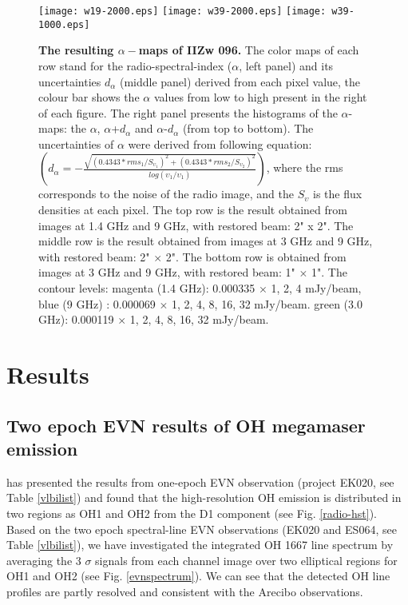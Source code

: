 \documentclass[]{aa} %
\begin{document}
\begin{figure*}
   \centering
\texttt{[image: w19-2000.eps]}
\texttt{[image: w39-2000.eps]}
\texttt{[image: w39-1000.eps]}


      \caption{\textbf{The resulting $\alpha-$maps of IIZw 096.} The color maps of each row stand for the radio-spectral-index ($\alpha$, left panel) and its uncertainties $d_{\alpha}$ (middle panel) derived from each pixel value, the colour bar shows the $\alpha$ values from low to high present in the right of each figure. The right panel presents the histograms of the $\alpha$-maps: the $\alpha$, $\alpha$+$d_{\alpha}$ and $\alpha$-$d_{\alpha}$ (from top to bottom). The uncertainties of $\alpha$ were derived from following equation: $(d_{\alpha}=-\frac{\sqrt{(0.4343*rms_{1}/S_{{\upsilon}_{1}})^2+(0.4343*rms_{2}/S_{{\upsilon}_{2}})^2}}{log(\upsilon_{1}/\upsilon_{1})})$, where the rms corresponds to the noise of the radio image, and the $S_{\upsilon}$ is the flux densities at each pixel. The top row is the result obtained from images at 1.4 GHz and 9 GHz, with restored beam: 2" x 2". The middle row is the result obtained from images at 3 GHz and 9 GHz, with restored beam: 2" $\times$ 2". The bottom row is obtained from images at 3 GHz and 9 GHz, with restored beam: 1" $\times$ 1". The contour levels: magenta (1.4 GHz): 0.000335 $\times$ 1, 2, 4 mJy/beam,  blue (9 GHz) : 0.000069 $\times$ 1, 2, 4, 8, 16, 32 mJy/beam.  green (3.0 GHz): 0.000119 $\times$ 1, 2, 4, 8, 16, 32 mJy/beam. }
    \label{359}%
\end{figure*}



\section{Results}
\subsection{Two epoch EVN results of OH megamaser emission}
  \cite{2010PhDT.......280C} has presented the results from one-epoch EVN observation (project EK020, see Table \ref{vlbilist}) and found that the high-resolution OH emission is distributed in two regions as OH1 and OH2 from the D1 component (see Fig. \ref{radio-hst}). Based on the two epoch spectral-line EVN observations (EK020 and ES064, see Table \ref{vlbilist}), we have investigated the integrated OH 1667 line spectrum by averaging the 3 $\sigma$ signals from each channel image over two elliptical regions for OH1 and OH2 (see Fig. \ref{evnspectrum}). We can see that the detected OH line profiles are partly resolved and consistent with the Arecibo observations.
\end{document}
